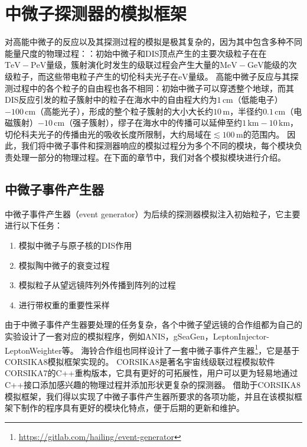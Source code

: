 \chapter{中微子探测器的模拟框架}
\label{chap:simulation_framework}

对高能中微子的反应以及其探测过程的模拟是极其复杂的，因为其中包含多种不同能量尺度的物理过程：：初始中微子和DIS顶点产生的主要次级粒子在在$\mathrm{TeV} - \mathrm{PeV}$量级，簇射演化时发生的级联过程会产生大量的$\mathrm{MeV} - \mathrm{GeV}$能级的次级粒子，而这些带电粒子产生的切伦科夫光子在$\mathrm{eV}$量级。
高能中微子反应与其探测过程中的各个粒子的自由程也各不相同：初始中微子可以穿透整个地球，而其DIS反应引发的粒子簇射中的粒子在海水中的自由程大约为$1\,\mathrm{cm}$（低能电子）$-100\,\mathrm{cm}$（高能光子），形成的整个粒子簇射的大小大长约$10\,\mathrm{m}$，半径约$0.1\,\mathrm{cm}$（电磁簇射）$-10\,\mathrm{cm}$（强子簇射），缪子在海水中的传播可以延伸至约$1\,\mathrm{km} - 10\,\mathrm{km}$，切伦科夫光子的传播由光的吸收长度所限制，大约局域在$\lesssim 100\, \mathrm{m}$的范围内。
因此，我们将中微子事件和探测器响应的模拟过程分为多个不同的模块，每个模块负责处理一部分的物理过程。在下面的章节中，我们对各个模拟模块进行介绍。

\section{中微子事件产生器}
\label{sec:event_generator}

中微子事件产生器（event generator）为后续的探测器模拟注入初始粒子，它主要进行以下任务：
\begin{enumerate}
    \item 模拟中微子与原子核的DIS作用
    \item 模拟陶中微子的衰变过程
    \item 模拟粒子从望远镜阵列外传播到阵列的过程
    \item 进行带权重的重要性采样
\end{enumerate}

由于中微子事件产生器要处理的任务复杂，各个中微子望远镜的合作组都为自己的实验设计了一套对应的模拟程序，例如\textsf{ANIS}\cite{ANIS:2004}，\textsf{gSeaGen}\cite{gSeaGen:2020}，\textsf{LeptonInjector-LeptonWeighter}\cite{LeptonInjector:2020}等。
海铃合作组也同样设计了一套中微子事件产生器\footnote{\url{https://gitlab.com/hailing/event-generator}}，它是基于\textsf{CORSIKA8}模拟框架\cite{CORSIKA8:2018, CORSIKA8:2022}实现的。
\textsf{CORSIKA8}是著名宇宙线级联过程模拟软件\textsf{CORSIKA7}\cite{CORSIKA7:1998}的C++重构版本，它具有更好的可拓展性，用户可以更为轻易地通过C++接口添加感兴趣的物理过程并添加形状更复杂的探测器。
借助于\textsf{CORSIKA8}模拟框架，我们得以实现了中微子事件产生器所要求的各项功能，并且在该模拟框架下制作的程序具有更好的模块化特点，便于后期的更新和维护。

